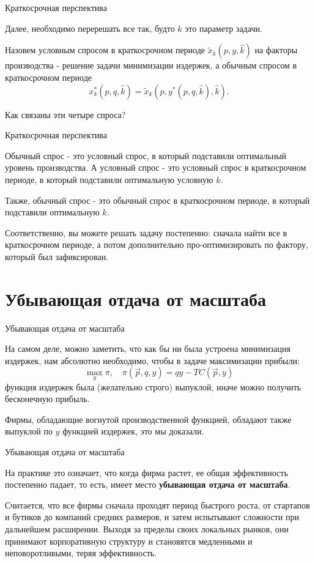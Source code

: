 \documentclass{beamer}
\begin{document}
\begin{frame}{Краткосрочная перспектива}

Далее, необходимо перерешать все так, будто $\hat k$ это параметр задачи.

\begin{definition}
Назовем условным спросом в краткосрочном периоде $\tilde x_{k}(p, y, \hat k)$ на факторы производства - решение задачи минимизации издержек, а обычным спросом в краткосрочном периоде
$$x_k^{\ast}(p, q, \hat k) = \tilde x_k(p, y^{\ast}(p, q, \hat k), \hat k).$$
\end{definition}
Как связаны эти четыре спроса?

\end{frame}

\begin{frame}{Краткосрочная перспектива}

Обычный спрос - это условный спрос, в который подставили оптимальный уровень производства. А условный спрос - это условный спрос в краткосрочном периоде, в который подставили оптимальную условную $k$.

Также, обычный спрос - это обычный спрос в краткосрочном периоде, в который подставили оптимальную $k$.

Соответственно, вы можете решать задачу постепенно: сначала найти все в краткосрочном периоде, а потом дополнительно про-оптимизировать по фактору, который был зафиксирован.

\end{frame}

\section{Убывающая отдача от масштаба}

\begin{frame}{Убывающая отдача от масштаба}

На самом деле, можно заметить, что как бы ни была устроена минимизация издержек, нам абсолютно необходимо, чтобы в задаче максимизации прибыли:
$$ \max_{y} \pi, \quad \pi(\vec p, q, y) = q y - TC(\vec p, y)$$
функция издержек была (желательно строго) выпуклой, иначе можно получить бесконечную прибыль.

Фирмы, обладающие вогнутой производственной функцией, обладают также выпуклой по $y$ функцией издержек, это мы доказали.

\end{frame}

\begin{frame}{Убывающая отдача от масштаба}

На практике это означает, что когда фирма растет, ее общая эффективность постепенно падает, то есть, имеет место \textbf{убывающая отдача от масштаба}.

Считается, что все фирмы сначала проходят период быстрого роста, от стартапов и бутиков до компаний средних размеров, и затем испытывают сложности при дальнейшем расширении. Выходя за пределы своих локальных рынков, они принимают корпоративную структуру и становятся медленными и неповоротливыми, теряя эффективность.

\end{frame}
\end{document}
